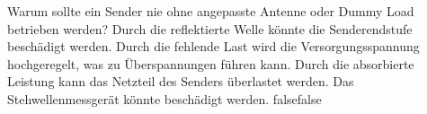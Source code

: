     {Warum sollte ein Sender nie ohne angepasste Antenne oder Dummy Load betrieben werden?}
    {Durch die reflektierte Welle könnte die Senderendstufe beschädigt werden.}
    {Durch die fehlende Last wird die Versorgungsspannung hochgeregelt, was zu Überspannungen führen kann. }
    {Durch die absorbierte Leistung kann das Netzteil des Senders überlastet werden.  }
    {Das Stehwellenmessgerät könnte beschädigt werden.}
    {false}{false}